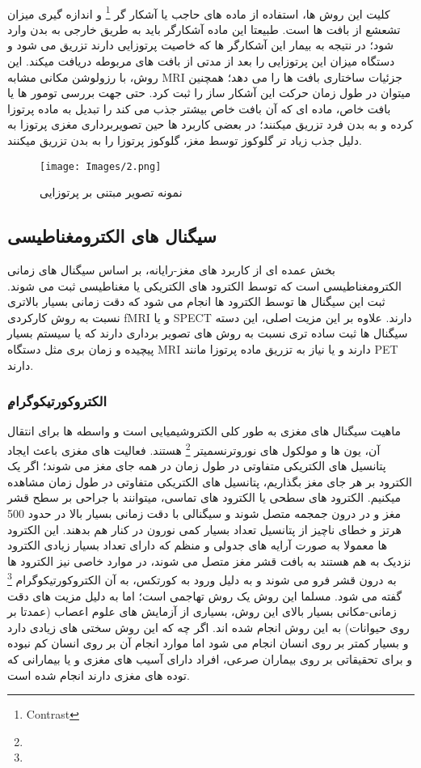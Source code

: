 \documentclass[11pt]{extarticle}
\begin{document}
\paragraph{}
کلیت این روش ها، استفاده از ماده های حاجب یا آشکار گر 
\footnote{Contrast}
و اندازه گیری میزان تشعشع از بافت ها است. طبیعتا این ماده آشکارگر باید به طریق خارجی به بدن وارد شود؛ در نتیجه به بیمار این آشکارگر ها که خاصیت پرتوزایی دارند تزریق می شود و دستگاه میزان این پرتوزایی را بعد از مدتی از بافت های مربوطه دریافت میکند. این روش، با رزولوشن مکانی مشابه MRI جزئیات ساختاری بافت ها را می دهد؛ همچنین میتوان در طول زمان حرکت این آشکار ساز را ثبت کرد. حتی جهت بررسی تومور ها یا بافت خاص، ماده ای که آن بافت خاص بیشتر جذب می کند را تبدیل به ماده پرتوزا کرده و به بدن فرد تزریق میکنند؛ در بعضی کاربرد ها حین تصویربرداری مغزی پرتوزا به دلیل جذب زیاد تر گلوکوز توسط مغز، گلوکوز پرتوزا را به بدن تزریق میکنند.

\begin{figure}[h!]
	\centering
	\texttt{[image: Images/2.png]}
	\caption{نمونه تصویر مبتنی بر پرتوزایی}
	\label{fig:5}
\end{figure}

\subsection{سیگنال های الکترومغناطیسی}
بخش عمده ای از کاربرد های مغز-رایانه، بر اساس سیگنال های زمانی الکترومغناطیسی است که توسط الکترود های الکتریکی یا مغناطیسی ثبت می شوند. ثبت این سیگنال ها توسط الکترود ها انجام می شود که دقت زمانی بسیار بالاتری نسبت به روش کارکردی 
fMRI
و یا 
SPECT
دارند. علاوه بر این مزیت اصلی، این دسته سیگنال ها ثبت ساده تری نسبت به روش های تصویر برداری دارند که یا سیستم بسیار پیچیده و زمان بری مثل دستگاه 
MRI
دارند و یا نیاز به تزریق ماده پرتوزا مانند 
PET
دارند.

\subsubsection{ٍالکتروکورتیکوگرام}
ماهیت سیگنال های مغزی به طور کلی الکتروشیمیایی است و واسطه ها برای انتقال آن، یون ها و مولکول های نوروترنسمیتر
\footnote{}
هستند. فعالیت های مغزی باعث ایجاد پتانسیل های الکتریکی متفاوتی در طول زمان در  همه جای مغز می شوند؛ اگر یک الکترود بر هر جای مغز بگذاریم، پتانسیل های الکتریکی متفاوتی در طول زمان مشاهده میکنیم. الکترود های سطحی یا الکترود های تماسی، میتوانند با جراحی بر سطح قشر مغز و در درون جمجمه متصل شوند و سیگنالی با دقت زمانی بسیار بالا در حدود 500 هرتز و خطای ناچیز از پتانسیل تعداد بسیار کمی نورون در کنار هم بدهند. این الکترود ها معمولا به صورت آرایه های جدولی و منظم که دارای تعداد بسیار زیادی الکترود نزدیک به هم هستند به بافت قشر مغز متصل می شوند، در موارد خاصی نیز الکترود ها به درون قشر فرو می شوند و به دلیل ورود به کورتکس، به آن الکتروکورتیکوگرام 
\footnote{}
گفته می شود.
مسلما این روش یک روش تهاجمی است؛ اما به دلیل مزیت های دقت زمانی-مکانی بسیار بالای این روش، بسیاری از آزمایش های علوم اعصاب (عمدتا بر روی حیوانات) به این روش انجام شده اند. اگر چه که این روش سختی های زیادی دارد و بسیار کمتر بر روی انسان انجام می شود اما موارد انجام آن بر روی انسان کم نبوده و برای تحقیقاتی بر روی بیماران صرعی، افراد دارای آسیب های مغزی و یا بیمارانی که توده های مغزی دارند انجام شده است.
\end{document}
